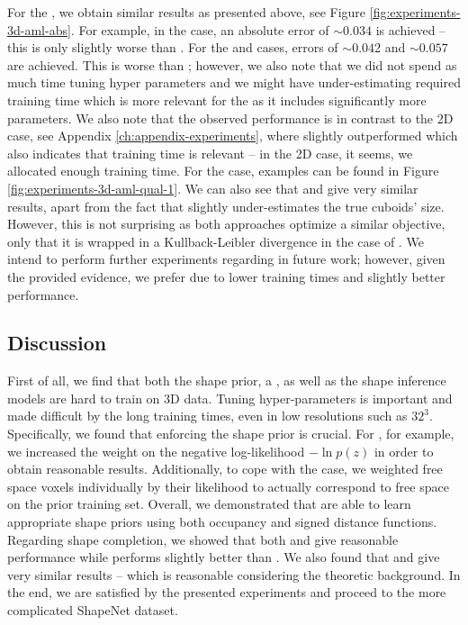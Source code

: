 For the \EVAE, we obtain similar results as presented above, see
Figure \ref{fig:experiments-3d-aml-abs}. For example,
in the \easy case, an absolute error \Abs of $\sim 0.034$ is achieved --
this is only slightly worse than \AML. For the \moderate and \hard cases,
errors of $\sim 0.042$ and $\sim 0.057$ are achieved. This is worse than
\AML; however, we also note that we did not spend as much time
tuning hyper parameters and we might have under-estimating
required training time which is more relevant for the \EVAE as it includes
significantly more parameters.
We also note that the observed performance is in contrast to the
2D case, see Appendix \ref{ch:appendix-experiments}, where \EVAE slightly
outperformed \AML which also indicates that training time is relevant
-- in the 2D case, it seems, we allocated enough training time.
For the \hard case, examples can be found in Figure \ref{fig:experiments-3d-aml-qual-1}.
We can also see that \AML and \EVAE give very similar results, apart from the
fact that \EVAE slightly under-estimates the true cuboids' size. However, this is not surprising
as both approaches optimize a similar objective, only that it is wrapped in a Kullback-Leibler
divergence in the case of \EVAE. We intend to perform further experiments regarding
\EVAE in future work; however, given the provided evidence, we prefer \AML
due to lower training times and slightly better performance.

\subsection{Discussion}

First of all, we find that both the shape prior, \ie a \VAE, as well as the shape inference
models are hard to train on 3D data. Tuning hyper-parameters is important and
made difficult by the long training times, even in low resolutions such as $32^3$.
Specifically, we found that enforcing the shape prior is crucial. For \AML, for example,
we increased the weight on the negative log-likelihood $- \ln p(z)$ in order to obtain
reasonable results. Additionally, to cope with the \hard case, we weighted
free space voxels individually by their likelihood to actually correspond to free space
on the prior training set.
Overall, we demonstrated that
\VAEs are able to learn appropriate shape priors using both occupancy and signed distance functions.
Regarding shape completion, we showed that both \AML and \EVAE give reasonable
performance while \AML performs slightly better than \EVAE.
We also found that \AML and \EVAE give very similar results -- which is reasonable
considering the theoretic background. In the end, we are satisfied by the presented experiments
and proceed to the more complicated ShapeNet dataset.
